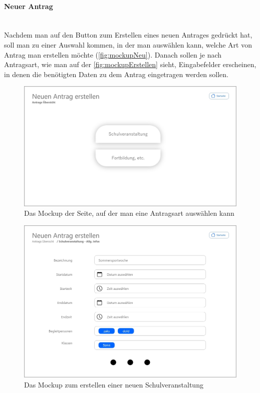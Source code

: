\paragraph{Neuer Antrag}
~\\
Nachdem man auf den Button zum Erstellen eines neuen Antrages gedrückt hat, soll man zu einer Auswahl kommen, in der man auswählen kann, welche Art von Antrag man erstellen möchte (\autoref{fig:mockupNeu}). Danach sollen je nach Antragsart, wie man auf der \autoref{fig:mockupErstellen} sieht, Eingabefelder erscheinen, in denen die benötigten Daten zu dem Antrag eingetragen werden sollen.
\begin{figure}[H]
	\centering
	\includegraphics[width=1\linewidth]{images/ldehner_konzept/Mockup-Neuer-Antrag}
	\caption[Mockup neuer Antrag]{Das Mockup der Seite, auf der man eine Antragsart auswählen kann}
	\label{fig:mockupNeu}
\end{figure}
\begin{figure}[H]
	\centering
	\includegraphics[width=1\linewidth]{images/ldehner_konzept/Mockup-Antrag-erstellen}
	\caption[Mockup Antrag erstellen]{Das Mockup zum erstellen einer neuen Schulveranstaltung}
	\label{fig:mockupErstellen}
\end{figure}
